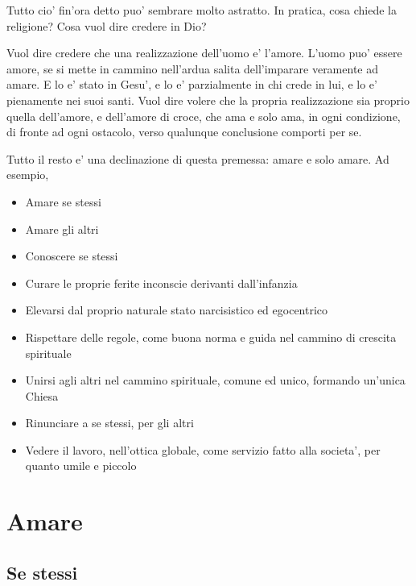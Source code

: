 Tutto cio' fin'ora detto puo' sembrare molto astratto. In pratica, cosa chiede la religione? Cosa vuol dire credere in Dio?

Vuol dire credere che una realizzazione dell'uomo e' l'amore. L'uomo puo' essere amore, se si mette in cammino nell'ardua salita dell'imparare veramente ad amare. E lo e' stato in Gesu', e lo e' parzialmente in chi crede in lui, e lo e' pienamente nei suoi santi. Vuol dire volere che la propria realizzazione sia proprio quella dell'amore, e dell'amore di croce, che ama e solo ama, in ogni condizione, di fronte ad ogni ostacolo, verso qualunque conclusione comporti per se.


Tutto il resto e' una declinazione di questa premessa: amare e solo amare. Ad esempio,
\begin{itemize}
    \item Amare se stessi
    \item Amare gli altri
    \item Conoscere se stessi
    \item Curare le proprie ferite inconscie derivanti dall'infanzia
    \item Elevarsi dal proprio naturale stato narcisistico ed egocentrico
    \item Rispettare delle regole, come buona norma e guida nel cammino di crescita spirituale
    \item Unirsi agli altri nel cammino spirituale, comune ed unico, formando un'unica Chiesa
    \item Rinunciare a se stessi, per gli altri
    \item Vedere il lavoro, nell'ottica globale, come servizio fatto alla societa', per quanto umile e piccolo
\end{itemize}


\section{Amare}
\label{amareSe}


\subsection{Se stessi}

